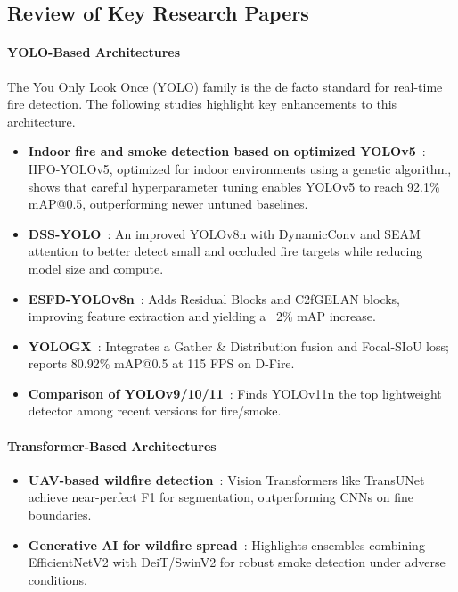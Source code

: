 \documentclass[12pt,a4paper]{article}
\begin{document}
\subsection{Review of Key Research Papers}
\paragraph{YOLO-Based Architectures}
The You Only Look Once (YOLO) family is the de facto standard for real-time fire detection. The following studies highlight key enhancements to this architecture.
\begin{itemize}
  \item \textbf{Indoor fire and smoke detection based on optimized YOLOv5}~\cite{sozol2025yolov5}: HPO-YOLOv5, optimized for indoor environments using a genetic algorithm, shows that careful hyperparameter tuning enables YOLOv5 to reach 92.1\% mAP@0.5, outperforming newer untuned baselines.
  \item \textbf{DSS-YOLO}~\cite{wang2025dssyolo}: An improved YOLOv8n with DynamicConv and SEAM attention to better detect small and occluded fire targets while reducing model size and compute.
  \item \textbf{ESFD-YOLOv8n}~\cite{mamadaliev2024esfd}: Adds Residual Blocks and C2fGELAN blocks, improving feature extraction and yielding a ~2\% mAP increase.
  \item \textbf{YOLOGX}~\cite{li2025yologx}: Integrates a Gather \& Distribution fusion and Focal-SIoU loss; reports 80.92\% mAP@0.5 at 115 FPS on D-Fire.
  \item \textbf{Comparison of YOLOv9/10/11}~\cite{alkhammash2025compare}: Finds YOLOv11n the top lightweight detector among recent versions for fire/smoke.
\end{itemize}

\paragraph{Transformer-Based Architectures}
\begin{itemize}
  \item \textbf{UAV-based wildfire detection}~\cite{ghali2022uav}: Vision Transformers like TransUNet achieve near-perfect F1 for segmentation, outperforming CNNs on fine boundaries.
  \item \textbf{Generative AI for wildfire spread}~\cite{xu2025genai}: Highlights ensembles combining EfficientNetV2 with DeiT/SwinV2 for robust smoke detection under adverse conditions.
\end{itemize}
\end{document}
